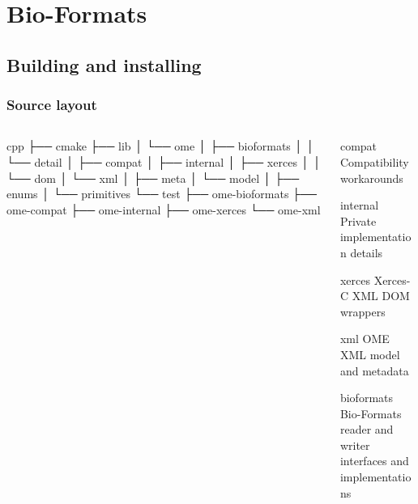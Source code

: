 \section{Bio-Formats}
\subsection{Building and installing}

\begin{frame}[fragile]
  \frametitle{Source layout}
  \begin{columns}
    \begin{column}{.5\linewidth}
      \begin{semiverbatim}\tiny
cpp
├── cmake
├── lib
│   └── ome
│       ├── bioformats
│       │   └── detail
│       ├── compat
│       ├── internal
│       ├── xerces
│       │   └── dom
│       └── xml
│           ├── meta
│           └── model
│               ├── enums
│               └── primitives
└── test
    ├── ome-bioformats
    ├── ome-compat
    ├── ome-internal
    ├── ome-xerces
    └── ome-xml
\end{semiverbatim}
      \end{column}
    \begin{column}{.5\linewidth}
      \begin{block}{compat}
        Compatibility workarounds
      \end{block}
      \begin{block}{internal}
        Private implementation details
      \end{block}
      \begin{block}{xerces}
        Xerces-C XML DOM wrappers
      \end{block}
      \begin{block}{xml}
        OME XML model and metadata
      \end{block}
      \begin{block}{bioformats}
        Bio-Formats reader and writer interfaces and implementations
      \end{block}
    \end{column}
  \end{columns}
\end{frame}

